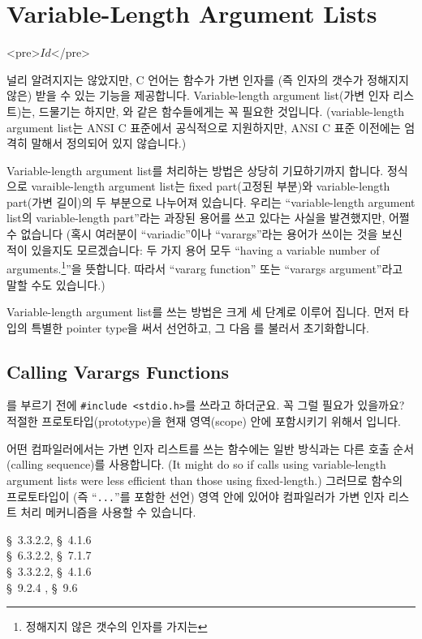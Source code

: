 \chapter{Variable-Length Argument Lists}	\label{chap:vlal}

\begin{rawhtml}
<pre>$Id$</pre>
\end{rawhtml}

널리 알려지지는 않았지만, C 언어는 함수가 가변 인자를 (즉 인자의 갯수가 
정해지지 않은) 받을 수 있는 기능을 제공합니다.
Variable-length argument list(가변 인자 리스트)는, 드물기는 하지만,
와 같은 함수들에게는 꼭 필요한 것입니다.
(variable-length argument list는 ANSI C 표준에서 공식적으로 지원하지만,
ANSI C 표준 이전에는 엄격히 말해서 정의되어 있지 않습니다.)

Variable-length argument list를 처리하는 방법은 상당히 기묘하기까지 합니다.
정식으로 varaible-length argument list는 fixed part(고정된 부분)와 
variable-length part(가변 길이)의
두 부분으로 나누어져 있습니다.  우리는 ``variable-length argument list의
variable-length part''라는 과장된 용어를 쓰고 있다는 사실을 발견했지만,
어쩔 수 없습니다 (혹시 여러분이 ``variadic''이나 ``varargs''라는 용어가
쓰이는 것을 보신 적이 있을지도 모르겠습니다: 두 가지 용어 모두
``having a variable number of arguments.\footnote{정해지지 않은 갯수의 인자를
가지는}''을 뜻합니다.  따라서 ``vararg function'' 또는 ``varargs argument''라고
말할 수도 있습니다.)

Variable-length argument list를 쓰는 방법은 크게 세 단계로 이루어 집니다.
먼저  타입의 특별한 pointer type을 써서 선언하고, 그 다음
를 불러서 초기화합니다.

\section{Calling Varargs Functions}

\begin{faq}
	를 부르기 전에 \verb+#include <stdio.h>+를 쓰라고
	하더군요.  꼭 그럴 필요가 있을까요?
\A
	적절한 프로토타입(prototype)을 현재 영역(scope) 안에 포함시키기
	위해서 입니다.

	어떤 컴파일러에서는 가변 인자 리스트를 쓰는 함수에는 일반 방식과는
	다른 호출 순서(calling sequence)를 사용합니다.
	(It might do so if calls using variable-length argument lists were
	less efficient than those using fixed-length.)
	그러므로 함수의 프로토타입이 (즉 ``\verb+...+''를 포함한 선언)
	영역 안에 있어야 컴파일러가 가변 인자 리스트 처리 메커니즘을
	사용할 수 있습니다.

\R
	\cite{ansi} \S\ 3.3.2.2, \S\ 4.1.6 \\
	\cite{c89} \S\ 6.3.2.2, \S\ 7.1.7 \\
	\cite{rationale} \S\ 3.3.2.2, \S\ 4.1.6 \\
	\cite{hs} \S\ 9.2.4 , \S\ 9.6 
\end{faq}

